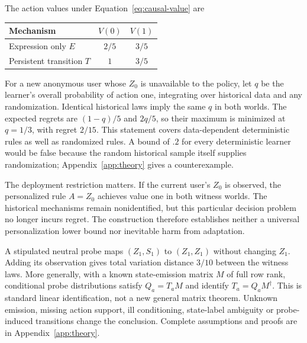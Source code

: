 \documentclass{article}
\begin{document}
The action values under Equation~\ref{eq:causal-value} are
\begin{center}
\begin{tabular}{lcc}
\toprule
Mechanism & $V(0)$ & $V(1)$ \\
\midrule
Expression only $E$ & $2/5$ & $3/5$ \\
Persistent transition $T$ & $1$ & $3/5$ \\
\bottomrule
\end{tabular}
\end{center}
For a new anonymous user whose $Z_0$ is unavailable to the policy, let $q$ be
the learner's overall probability of action one, integrating over historical
data and any randomization. Identical historical laws imply the same $q$ in
both worlds. The expected regrets are $(1-q)/5$ and $2q/5$, so their maximum is
minimized at $q=1/3$, with regret $2/15$. This statement covers data-dependent
deterministic rules as well as randomized rules. A bound of $.2$ for every
deterministic learner would be false because the random historical sample
itself supplies randomization; Appendix~\ref{app:theory} gives a counterexample.

The deployment restriction matters. If the current user's $Z_0$ is observed,
the personalized rule $A=Z_0$ achieves value one in both witness worlds. The
historical mechanisms remain nonidentified, but this particular decision
problem no longer incurs regret. The construction therefore establishes neither
a universal personalization lower bound nor inevitable harm from adaptation.

A stipulated neutral probe maps $(Z_1,S_1)$ to $(Z_1,Z_1)$ without changing
$Z_1$. Adding its observation gives total variation distance $3/10$ between
the witness laws. More generally, with a known state-emission matrix $M$ of
full row rank, conditional probe distributions satisfy $Q_a=T_aM$ and identify
$T_a=Q_aM^\dagger$. This is standard linear identification, not a new general
matrix theorem. Unknown emission, missing action support, ill conditioning,
state-label ambiguity or probe-induced transitions change the conclusion.
Complete assumptions and proofs are in Appendix~\ref{app:theory}.
\end{document}
